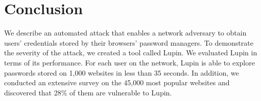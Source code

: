 \documentclass[letterpaper,twocolumn,10pt]{article}
\begin{document}
\section{Conclusion}
\label{sec:conclusion}
We describe an automated attack that enables a network adversary to
obtain users' credentials stored by their browsers' password managers.
To demonstrate the severity of the attack, we created a tool called 
Lupin. We evaluated Lupin in terms of its performance. For each user
on the network, Lupin is able to explore passwords stored on
1,000 websites in less than 35 seconds. In addition, we conducted
an extensive survey on the 45,000 most popular websites and discovered
that 28\% of them are vulnerable to Lupin.

{
}
\end{document}
